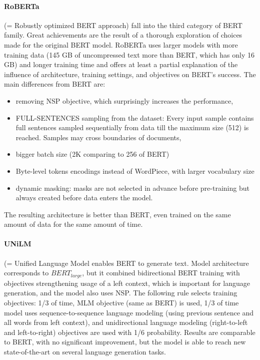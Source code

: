 \paragraph{RoBERTa} (= Robustly optimized BERT approach) \citep{Liu2019} fall into the third category of BERT family. Great achievements are the result of a thorough exploration of choices made for the original BERT model. RoBERTa uses larger models with more training data (145 GB of uncompressed text more than BERT, which has only 16 GB) and longer training time and offers at least a partial explanation of the influence of architecture, training settings, and objectives on BERT's success. The main differences from BERT are:
\begin{itemize}
\item removing NSP objective, which surprisingly increases the performance,
\item FULL-SENTENCES sampling from the dataset: Every input sample contains full sentences sampled sequentially from data till the maximum size (512) is reached.  Samples may cross boundaries of documents,
\item bigger batch size (2K comparing to 256 of BERT)
\item Byte-level tokens encodings instead of WordPiece, with larger vocabulary size
\item dynamic masking: masks are not selected in advance before pre-training but always created before data enters the model.
\end{itemize}
The resulting architecture is better than BERT, even trained on the same amount of data for the same amount of time.
\paragraph{UNiLM} (= Unified Language Model \citep{Dong2019} enables BERT to generate text. Model architecture corresponds to $BERT_{large}$, but it combined bidirectional BERT training with objectives strengthening usage of a left context, which is important for language generation, and the model also uses NSP. The following rule selects training objectives: 1/3 of time, MLM objective (same as BERT) is used, 1/3 of time model uses sequence-to-sequence language modeling (using previous sentence and all words from left context), and unidirectional language modeling (right-to-left and left-to-right) objectives are used with 1/6 probability. Results are comparable to BERT, with no significant improvement, but the model is able to reach new state-of-the-art on several language generation tasks.
